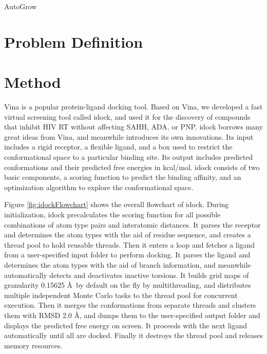\documentclass[10pt, conference, compsocconf]{../IEEEtran}
\begin{document}
AutoGrow

\section{Problem Definition}



\section{Method}

Vina is a popular protein-ligand docking tool. Based on Vina, we developed a fast virtual screening tool called idock, and used it for the discovery of compounds that inhibit HIV RT without affecting SAHH, ADA, or PNP. idock borrows many great ideas from Vina, and meanwhile introduces its own innovations. Its input includes a rigid receptor, a flexible ligand, and a box used to restrict the conformational space to a particular binding site. Its output includes predicted conformations and their predicted free energies in kcal/mol. idock consists of two basic components, a scoring function to predict the binding affinity, and an optimization algorithm to explore the conformational space.

Figure \ref{fig:idockFlowchart} shows the overall flowchart of idock. During initialization, idock precalculates the scoring function for all possible combinations of atom type pairs and interatomic distances. It parses the receptor and determines the atom types with the aid of residue sequence, and creates a thread pool to hold reusable threads. Then it enters a loop and fetches a ligand from a user-specified input folder to perform docking. It parses the ligand and determines the atom types with the aid of branch information, and meanwhile automatically detects and deactivates inactive torsions. It builds grid maps of granularity 0.15625 \AA\ by default on the fly by multithreading, and distributes multiple independent Monte Carlo tasks to the thread pool for concurrent execution. Then it merges the conformations from separate threads and clusters them with RMSD 2.0 \AA, and dumps them to the user-specified output folder and displays the predicted free energy on screen. It proceeds with the next ligand automatically until all are docked. Finally it destroys the thread pool and releases memory resources.

\end{document}

